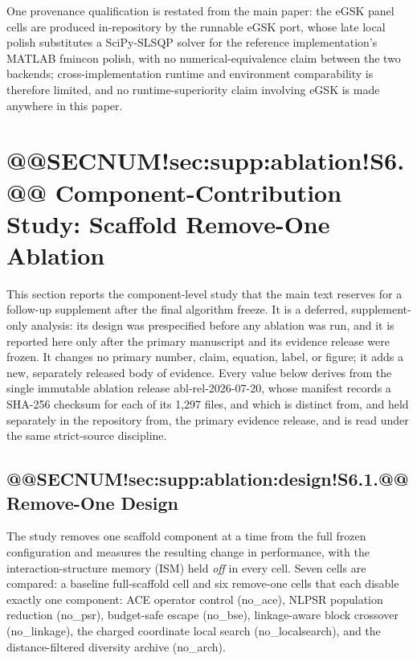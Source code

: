 \documentclass[10pt,a4paper]{article}
\newcommand{\egsk}{eGSK}
\begin{document}
One provenance qualification is restated from the main paper: the
\egsk{} panel cells are produced in-repository by the runnable \egsk{}
port, whose late local polish substitutes a SciPy-SLSQP solver for the
reference implementation's MATLAB fmincon polish, with no numerical-equivalence
claim between the two backends; cross-implementation runtime and
environment comparability is therefore limited, and no
runtime-superiority claim involving \egsk{} is made anywhere in this paper.















\section{@@SECNUM!sec:supp:ablation!S6.@@ Component-Contribution Study: Scaffold Remove-One Ablation}\label{sec:supp:ablation}

This section reports the component-level study that the main text reserves
for a follow-up supplement after the final algorithm freeze.  It is a
deferred, supplement-only analysis: its design was prespecified before any
ablation was run, and it is reported here only after the primary manuscript
and its evidence release were frozen.  It
changes no primary number, claim, equation, label, or figure; it adds a new,
separately released body of evidence.  Every value below derives from the
single immutable ablation release abl-rel-2026-07-20, whose manifest
records a SHA-256 checksum for each of its 1{,}297 files, and which is
distinct from, and held separately in the repository from, the primary
evidence release, and is read under the same strict-source discipline.

\subsection{@@SECNUM!sec:supp:ablation:design!S6.1.@@ Remove-One Design}\label{sec:supp:ablation:design}

The study removes one scaffold component at a time from the full frozen
configuration and measures the resulting change in performance, with the
interaction-structure memory (ISM) held \emph{off} in every cell.  Seven
cells are compared: a baseline full-scaffold cell and six remove-one
cells that each disable exactly one component: ACE operator control
(no\_ace), NLPSR population reduction (no\_psr),
budget-safe escape (no\_bse), linkage-aware block crossover
(no\_linkage), the charged coordinate local search
(no\_localsearch), and the distance-filtered diversity archive
(no\_arch).
\end{document}
